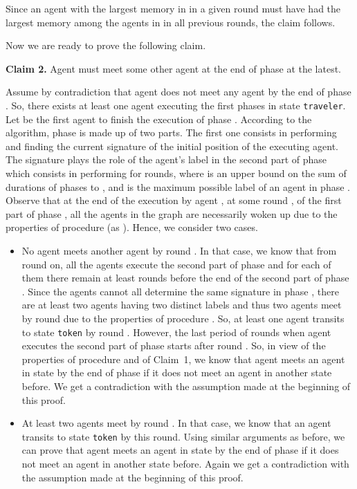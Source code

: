 \documentclass[11pt]{article}
\newcommand{\finclaim}{\hfill }
\newcommand{\qed}{\hfill  \bigbreak}
\newenvironment{proof}{\noindent {\bf Proof.}}{\qed}
\begin{document}
\begin{proof}
{Since an agent with the largest memory in  in a given round must have had the largest memory among the agents in  in all previous rounds, the claim follows.} \finclaim

Now we are ready to prove the following claim.

\vspace*{0.3cm}
\noindent
{{\bf Claim 2.} Agent  must meet some other agent at the end of phase  at the latest.}

{Assume by contradiction that agent  does not meet any agent by the end of phase . So, there exists at least one agent executing the first { phases} in state {\tt traveler}.
Let  be the first agent to finish the execution of phase . According to the algorithm, phase  is made up of two parts.
The first one consists in performing  and finding the current signature  of the initial position of the executing agent. The signature  plays the role of the agent's label in the second part of phase  which consists in performing  for { rounds, where  is an upper bound on the sum of durations of phases  to , and  is the maximum possible label of an agent in phase }. Observe that at the end of the execution by agent , at some round , of the first part of phase , all the agents in the graph are necessarily woken up due to the properties of procedure  (as ). Hence, we consider two cases.}
\begin{itemize}
\item{No agent meets another agent by round {}. In that case, we know that from round {} on, all the agents execute the second part of phase  and for each of them there remain at least  rounds before the end of the second part of phase . Since the agents cannot all determine the same signature in phase , there are at least two agents having two distinct labels and thus two agents meet by round {} due to the properties of procedure . So, at least one agent transits to state {\tt token} by round . However, the last period of  rounds when agent  executes the second part of phase  starts after round . So, in view of the properties of procedure  and of Claim~1, we know that agent  meets an agent in state  by the end of phase  if it does not meet an agent in another state before. We get a contradiction with the assumption made at the beginning of this proof.}

\item{At least two agents meet by round {}. In that case, we know that an agent transits to state {\tt token} by this round. Using similar arguments as before, we can prove that agent  meets an agent in state  by the end of phase  if it does not meet an agent in another state before. Again we get a contradiction with the assumption made at the beginning of this proof.}
\end{itemize}


\end{proof}
\end{document}
